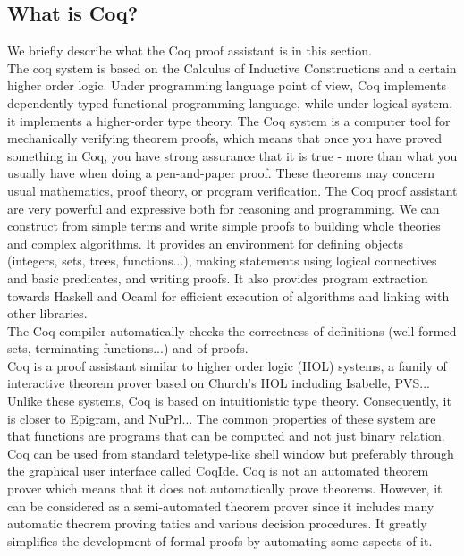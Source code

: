 \subsection{What is Coq?}
We briefly describe what the Coq proof assistant is in this section.\\
The coq system is based on the Calculus of Inductive Constructions and a certain higher order logic. Under programming language point of view, Coq implements dependently typed functional programming language, while under logical system, it implements a higher-order type theory.
The Coq system is a computer tool for mechanically verifying theorem proofs, which means that once you have proved something in Coq, you have strong assurance that it is true - more than what you usually have when doing a pen-and-paper proof. These theorems may concern usual mathematics, proof theory, or program verification. The Coq proof assistant are very powerful and expressive both for reasoning and programming. We can construct from simple terms and write simple proofs to building whole theories and complex algorithms. It provides an environment for defining objects (integers, sets, trees, functions...), making statements using logical connectives and basic predicates, and writing proofs. It also provides program extraction towards Haskell and Ocaml for efficient execution of algorithms and linking with other libraries.\\
The Coq compiler automatically checks the correctness of definitions (well-formed
sets, terminating functions...) and of proofs.\\
Coq is a proof assistant similar to higher order logic (HOL) systems, a family of interactive theorem prover based on Church's HOL including Isabelle, PVS... Unlike these systems, Coq is based on intuitionistic type theory. Consequently, it is closer to Epigram, and NuPrl... The common properties of these system are that functions are programs that can be computed and not just binary relation.
Coq can be used from standard teletype-like shell window but preferably through the graphical user interface called CoqIde. Coq is not an automated theorem prover which means that it does not automatically prove theorems. However, it can be considered as a semi-automated theorem prover since it includes many automatic theorem proving tatics and various decision procedures. It greatly simplifies the development of formal proofs by automating some aspects of it. 
